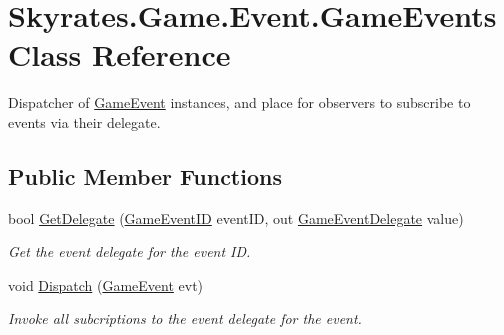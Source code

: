 \hypertarget{class_skyrates_1_1_game_1_1_event_1_1_game_events}{\section{Skyrates.\-Game.\-Event.\-Game\-Events Class Reference}
\label{class_skyrates_1_1_game_1_1_event_1_1_game_events}
}


Dispatcher of \hyperlink{class_skyrates_1_1_game_1_1_event_1_1_game_event}{Game\-Event} instances, and place for observers to subscribe to events via their delegate.  


\subsection*{Public Member Functions}
\begin{DoxyCompactItemize}
\item 
bool \hyperlink{class_skyrates_1_1_game_1_1_event_1_1_game_events_a46b29a166e79a01f3fb4830241169cea}{Get\-Delegate} (\hyperlink{namespace_skyrates_1_1_game_1_1_event_ad31565d2f03f234f8f77ebf23ff8f150}{Game\-Event\-I\-D} event\-I\-D, out \hyperlink{namespace_skyrates_1_1_game_1_1_event_a06bcdcadb00cfbf4d4ebd1b2e6ad623d}{Game\-Event\-Delegate} value)
\begin{DoxyCompactList}\small\item\em Get the event delegate for the event I\-D. \end{DoxyCompactList}\item 
void \hyperlink{class_skyrates_1_1_game_1_1_event_1_1_game_events_a334239fbc5993dda8fb5bf403e0ca193}{Dispatch} (\hyperlink{class_skyrates_1_1_game_1_1_event_1_1_game_event}{Game\-Event} evt)
\begin{DoxyCompactList}\small\item\em Invoke all subcriptions to the event delegate for the event. \end{DoxyCompactList}\end{DoxyCompactItemize}
